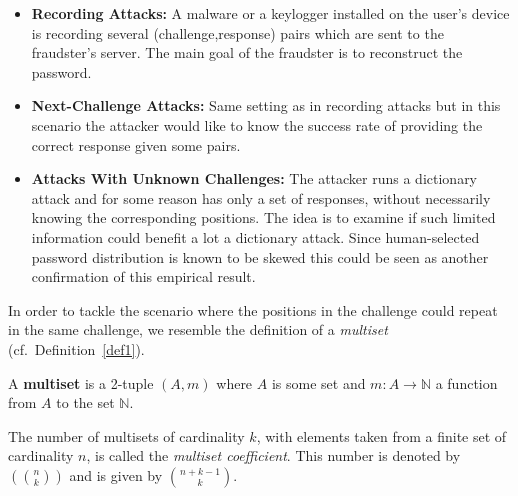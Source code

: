 \documentclass{llncs}
\begin{document}
\begin{itemize}
  \item \textbf{Recording Attacks:} A malware or a keylogger installed on the user's device is recording several (challenge,response) pairs which are sent to the fraudster's server. The main goal of the fraudster is to reconstruct the password.
  \item \textbf{Next-Challenge Attacks:} Same setting as in recording attacks but in this scenario the attacker would like to know the success rate of
      providing the correct response given some pairs.
  \item \textbf{Attacks With Unknown Challenges:} The attacker runs a dictionary attack and for some reason has only a set of responses, without necessarily knowing the corresponding positions. The idea is to examine if such limited information could benefit a lot a dictionary attack. Since human-selected password distribution is known to be skewed \cite{bonneau,bonneau2} this could be seen as another confirmation of this empirical result.
\end{itemize}



In order to tackle the scenario
where the positions in the challenge could repeat in the same
challenge, we resemble the definition of a \textit{multiset} (cf.~Definition~\ref{def1}).

\begin{definition} \label{def1}
A \textbf{multiset} is a 2-tuple $(A,m)$ where $A$ is some set and \linebreak $m:A\rightarrow \mathbb{N}$
a function from $A$ to the set $\mathbb{N}$.
\end{definition}

\noindent The number of multisets of cardinality $k$, with elements taken
from a finite set of cardinality $n$, is
called the \textit{multiset coefficient}. This number is denoted by $\left(\!\!{n\choose k}\!\!\right)$ and is given
by $\binom{n+k-1}{k}$.




\end{document}
